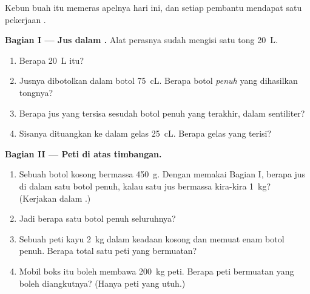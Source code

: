 \begin{problem}\label{pb:g6:mass-and-volume:1}
Kebun buah itu memeras apelnya hari ini, dan setiap pembantu mendapat
satu pekerjaan .

\medskip\noindent\textbf{Bagian I --- Jus dalam .}
Alat perasnya sudah mengisi satu tong \qty{20}{L}.
\begin{enumerate}
  \item Berapa  \qty{20}{L} itu?
  \item Jusnya dibotolkan dalam botol \qty{75}{cL}. Berapa botol
        \emph{penuh} yang dihasilkan tongnya?
  \item Berapa jus yang tersisa sesudah botol penuh yang terakhir,
        dalam sentiliter?
  \item Sisanya dituangkan ke dalam gelas \qty{25}{cL}. Berapa gelas
        yang terisi?
\end{enumerate}

\medskip\noindent\textbf{Bagian II --- Peti di atas timbangan.}
\begin{enumerate}[resume]
  \item Sebuah botol kosong bermassa \qty{450}{g}. Dengan memakai
        Bagian I, berapa  jus di dalam satu botol penuh, kalau
        satu  jus bermassa kira-kira \qty{1}{kg}? (Kerjakan
        dalam .)
  \item Jadi berapa  satu botol penuh seluruhnya?
  \item Sebuah peti kayu  \qty{2}{kg} dalam keadaan kosong
        dan memuat enam botol penuh. Berapa  total satu peti
        yang bermuatan?
  \item Mobil boks itu boleh membawa \qty{200}{kg} peti. Berapa peti
        bermuatan yang boleh diangkutnya? (Hanya peti yang utuh.)
\end{enumerate}


\end{problem}
